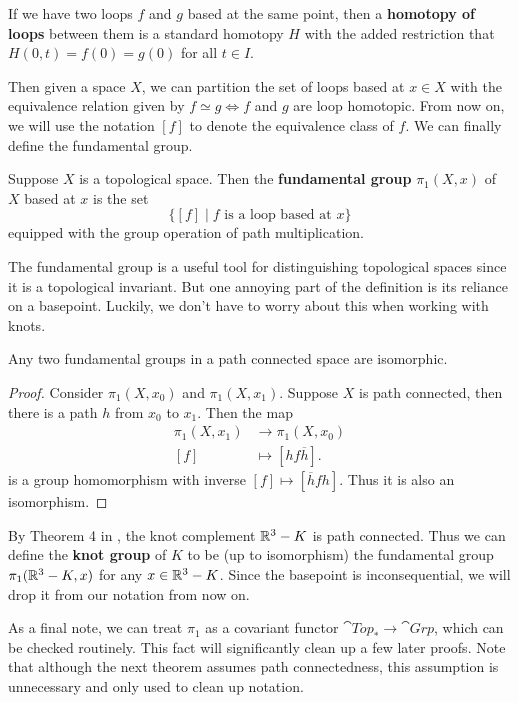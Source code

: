 \documentclass[twoside,10pt]{article}
\begin{document}
If we have two loops $f$ and $g$ based at the same point, then a \textbf{homotopy of loops} between them is a standard homotopy $H$ with the added restriction that $H(0,t) = f(0)=g(0)$ for all $t \in I$.

Then given a space $X$, we can partition the set of loops based at $x \in X$ with the equivalence relation given by $f \simeq g \iff f$ and $g$ are loop homotopic. From now on, we will use the notation $[f]$ to denote the equivalence class of $f$. We can finally define the fundamental group.

\begin{defn}[]
	Suppose $X$ is a topological space. Then the \textbf{fundamental group} $\pi_1(X,x)$ of $X$ based at $x$ is the set
	\[
		\Big\{ [f] \;\Big|\; f \text{ is a loop based at } x \Big\}
	\] equipped with the group operation of path multiplication.
\end{defn}

The fundamental group is a useful tool for distinguishing topological spaces since it is a topological invariant. But one annoying part of the definition is its reliance on a basepoint. Luckily, we don't have to worry about this when working with knots.

\begin{prop}
Any two fundamental groups in a path connected space are isomorphic.
\end{prop}
\begin{proof}
	Consider $\pi_1(X,x_0)$ and $\pi_1(X,x_1)$. Suppose $X$ is path connected, then there is a path $h$ from $x_0$ to $x_1$. Then the map
        \begin{align*}
                \pi_1(X,x_1) &\to \pi_1(X,x_0) \\
                [f] &\mapsto [h f \overline{h}].
        \end{align*}
	is a group homomorphism with inverse $[f] \mapsto [\overline{h}fh]$. Thus it is also an isomorphism.
\end{proof}

By Theorem 4 in \cite{hur}, the knot complement $\mathbb{R}^{3}-K$ is path connected. Thus we can define the \textbf{knot group} of $K$ to be (up to isomorphism) the fundamental group $\pi_1(\mathbb{R}^{3}-K, x)$ for any $x \in \mathbb{R}^{3}-K$. Since the basepoint is inconsequential, we will drop it from our notation from now on.

As a final note, we can treat $\pi_1$ as a covariant functor $\cat{Top}_*\to \cat{Grp}$, which can be checked routinely. This fact will significantly clean up a few later proofs. Note that although the next theorem assumes path connectedness, this assumption is unnecessary and only used to clean up notation.
\end{document}
